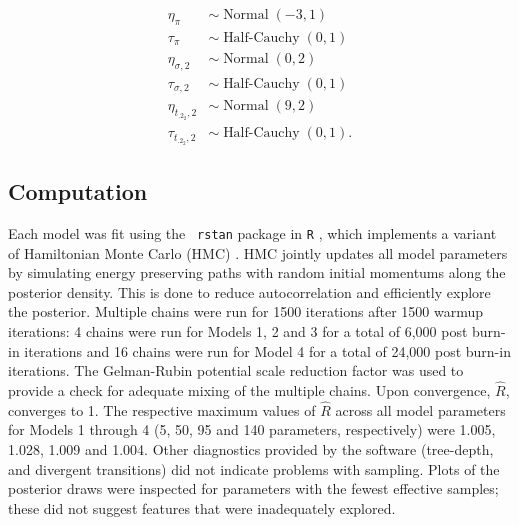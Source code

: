\documentclass[aap]{imsart}
\newcommand{\op}{\operatorname}
\begin{document}
\begin{align*}
  \eta_{\pi} & \sim \op{Normal}(-3, 1)\\
  \tau_{\pi} & \sim \op{Half-Cauchy}(0, 1)\\
  \eta_{\sigma ,2} & \sim \op{Normal}(0, 2)\\
  \tau_{\sigma ,2} & \sim \op{Half-Cauchy}(0, 1)\\
  \eta_{t_{.2_2},2} & \sim \op{Normal}(9, 2)\\
  \tau_{t_{.2_2},2} & \sim \op{Half-Cauchy}(0, 1).
 \end{align*} 

\subsection{Computation}
\label{sec:Computation}
Each model was fit using the {\tt
  rstan} \citep{rstan} package in {\tt R} \citep{r}, which implements a variant of Hamiltonian Monte Carlo (HMC)
\citep{betancourt}. HMC jointly updates all model parameters by simulating energy preserving paths with random initial momentums along the posterior density. This is done to reduce autocorrelation and efficiently explore the posterior. Multiple chains were run for 1500 iterations after 1500 warmup iterations: 4 chains were run for Models 1, 2 and 3 for a total of 6,000 post burn-in iterations and 16 chains were run for Model 4 for a total of 24,000 post burn-in iterations. The Gelman-Rubin potential scale reduction factor was used to provide a check for adequate mixing of the multiple chains. Upon convergence, $\hat{R}$, converges to 1.  The  respective maximum values of $\hat{R}$ across all model parameters for Models 1 through 4 (5, 50, 95 and 140 parameters, respectively) were 1.005, 1.028, 1.009 and 1.004. Other diagnostics provided by the software (tree-depth, and divergent transitions) did not indicate problems with sampling. Plots of the posterior draws were inspected for parameters with the fewest effective samples; these did not suggest features that were inadequately explored.

\end{document}
